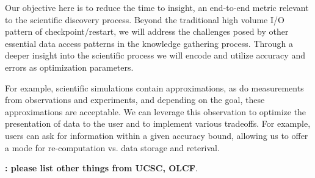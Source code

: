 \documentclass[11pt,letterpaper]{article}
\begin{document}


%

%
Our objective here is to reduce the time to insight, an end-to-end metric
relevant to the scientific discovery process. Beyond the traditional high
volume I/O pattern of checkpoint/restart, we will address the challenges
posed by other essential data access patterns in the knowledge gathering
process. Through a deeper insight into the scientific process we will encode
and utilize accuracy and errors as optimization parameters. 
%

For example, scientific simulations contain approximations, as do measurements 
from observations and experiments, and depending on the goal, these approximations 
are acceptable. We can leverage this observation to optimize the presentation of data
to the user and to implement various tradeoffs. For example, users can ask for information 
within a given accuracy bound, allowing us to offer a mode for re-computation vs. data storage
and reterival.

%
{\bf: please list other things from UCSC, OLCF}.
%
\end{document}
